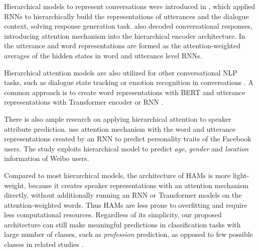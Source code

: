 Hierarchical models to represent conversations were introduced in \citet{serban2016building}, which applied RNNs to hierarchically build the representations of utterances and the dialogue context, solving response generation task. \citet{atten8} also decoded conversational responses, introducing attention mechanism into the hierarchical encoder architecture. In \citet{atten8} the utterance and word representations are formed as the attention-weighted averages of the hidden states in word and utterance level RNNs. 

Hierarchical attention models are also utilized for other conversational NLP tasks, such as dialogue state tracking \cite{shan2020contextual} or emotion recognition in conversations \cite{li2020hierarchical, ma2021han}. A common approach is to create word representations with BERT and utterance representations with Transformer encoder \cite{shan2020contextual, li2020hierarchical} or RNN \cite{ma2021han}.

There is also ample research on applying hierarchical attention to speaker attribute prediction. \citet{lynn2020hierarchical} use attention mechanism with the word and utterance representations created by an RNN to predict personality traits of the Facebook users. The study \cite{li2019improving} exploits hierarchical model to predict \textit{age}, \textit{gender} and \textit{location} information of Weibo users.

Compared to most hierarchical models, the architecture of HAMs is more light\hyp{}weight, because it creates speaker representations with an attention mechanism directly, without additionally running an RNN or Transformer models on the attention-weighted words. Thus HAMs are less prone to overfitting and require less computational resources. Regardless of its simplicity, our proposed architecture can still make meaningful predictions in classification tasks with large number of classes, such as \textit{profession} prediction, as opposed to few possible classes in related studies \cite{lynn2020hierarchical, li2019improving}. 



 



